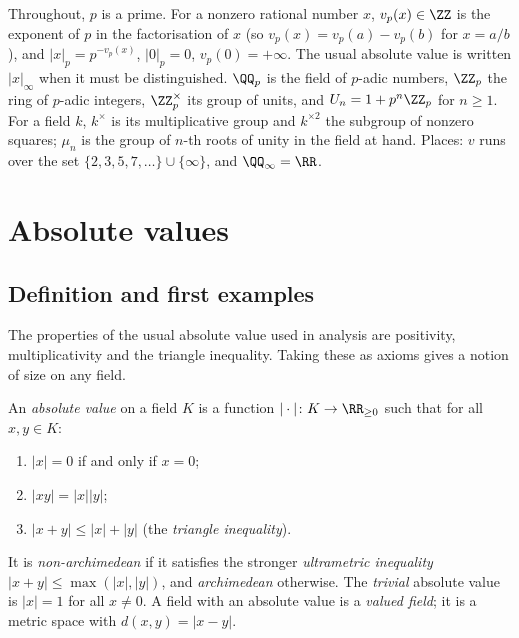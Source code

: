 \begin{notation}\label{p-adic-numbers:notation-basic}
Throughout, $p$ is a prime. For a nonzero rational number $x$, $v_p(x) \in \ZZ$ is the exponent of $p$ in the factorisation of $x$ (so $v_p(x) = v_p(a) - v_p(b)$ for $x = a/b$), and
$|x|_p = p^{-v_p(x)}$, $|0|_p = 0$, $v_p(0) = +\infty$. The usual absolute value is written $|x|_\infty$ when it must be distinguished. $\QQ_p$ is the field of $p$-adic numbers, $\ZZ_p$ the ring of
$p$-adic integers, $\ZZ_p^\times$ its group of units, and $U_n = 1 + p^n\ZZ_p$ for $n \geq 1$. For a field $k$, $k^\times$ is its multiplicative group and $k^{\times2}$ the subgroup of nonzero squares;
$\mu_n$ is the group of $n$-th roots of unity in the field at hand. Places: $v$ runs over the set $\{2, 3, 5, 7, \ldots\} \cup \{\infty\}$, and $\QQ_\infty = \RR$.
\end{notation}

\section{Absolute values}\label{p-adic-numbers:section-absolute-values}

\subsection{Definition and first examples}\label{p-adic-numbers:subsection-absolute-values}

The properties of the usual absolute value used in analysis are positivity, multiplicativity and the triangle inequality. Taking these as axioms gives a notion of size on any field.

\begin{definition}\label{p-adic-numbers:definition-absolute-value}
An \emph{absolute value} on a field $K$ is a function $|\cdot| \colon K \to \RR_{\geq 0}$ such that for all $x, y \in K$:
\begin{enumerate}
\item $|x| = 0$ if and only if $x = 0$;
\item $|xy| = |x||y|$;
\item $|x + y| \leq |x| + |y|$ (the \emph{triangle inequality}).
\end{enumerate}
It is \emph{non-archimedean} if it satisfies the stronger \emph{ultrametric inequality} $|x + y| \leq \max(|x|, |y|)$, and \emph{archimedean} otherwise. The \emph{trivial} absolute value is $|x| = 1$ for
all $x \neq 0$. A field with an absolute value is a \emph{valued field}; it is a metric space with $d(x, y) = |x - y|$.
\end{definition}

